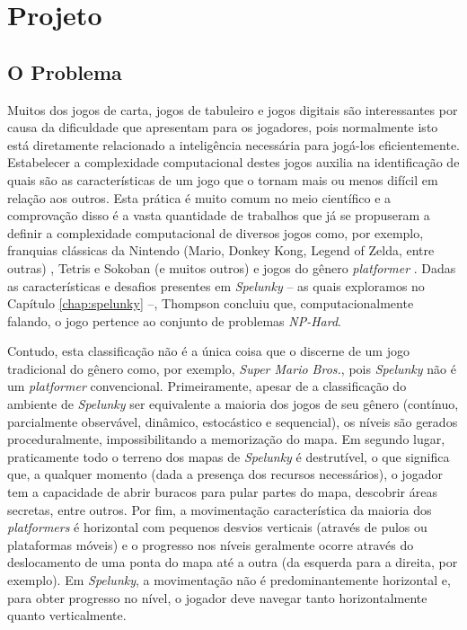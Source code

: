\chapter{\label{chap:project}Projeto}


\section{\label{section:problem}O Problema}
Muitos dos jogos de carta, jogos de tabuleiro e jogos digitais são interessantes
por causa da dificuldade que apresentam para os jogadores, pois normalmente isto
está diretamente relacionado a inteligência necessária para jogá-los
eficientemente.  Estabelecer a complexidade computacional destes jogos auxilia
na identificação de quais são as características de um jogo que o tornam mais ou
menos difícil em relação aos outros. Esta prática é muito comum no meio
científico e a comprovação disso é a vasta quantidade de trabalhos que já se
propuseram a definir a complexidade computacional de diversos jogos como, por
exemplo, franquias clássicas da Nintendo (Mario, Donkey Kong, Legend of Zelda,
entre outras) \cite{classic_nintendo_games_hard}, Tetris e Sokoban (e muitos
outros) \cite{playing_games_algorithms} e jogos do gênero \textit{platformer}
\cite{computational_complexity_platformers}. Dadas as características e desafios
presentes em \textit{Spelunky} -- as quais exploramos no Capítulo
\ref{chap:spelunky} --, Thompson \cite{SPELUNKYHARD} concluiu que,
computacionalmente falando, o jogo pertence ao conjunto de problemas
\textit{NP-Hard}.

Contudo, esta classificação não é a única coisa que o discerne de um jogo
tradicional do gênero como, por exemplo, \textit{Super Mario Bros.}, pois
\textit{Spelunky} não é um \textit{platformer} convencional. Primeiramente,
apesar de a classificação do ambiente de \textit{Spelunky} ser equivalente a
maioria dos jogos de seu gênero (contínuo, parcialmente observável, dinâmico,
estocástico e sequencial), os níveis são gerados proceduralmente,
impossibilitando a memorização do mapa. Em segundo lugar, praticamente todo o
terreno dos mapas de \textit{Spelunky} é destrutível, o que significa que, a
qualquer momento (dada a presença dos recursos necessários), o jogador tem a
capacidade de abrir buracos para pular partes do mapa, descobrir áreas secretas,
entre outros. Por fim, a movimentação característica da maioria dos
\textit{platformers} é horizontal com pequenos desvios verticais (através de
pulos ou plataformas móveis) e o progresso nos níveis geralmente ocorre através
do deslocamento de uma ponta do mapa até a outra (da esquerda para a direita,
por exemplo). Em \textit{Spelunky}, a movimentação não é predominantemente
horizontal e, para obter progresso no nível, o jogador deve navegar tanto
horizontalmente quanto verticalmente.

